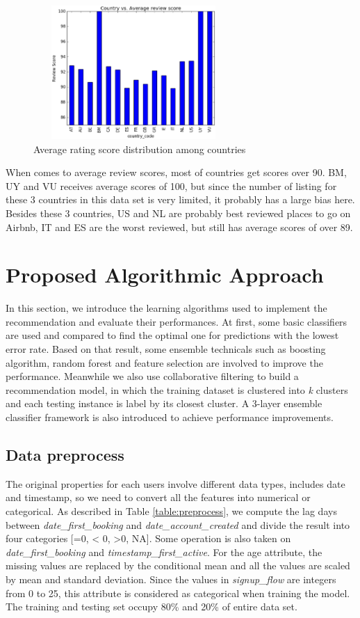 \documentclass{sig-alternate-05-2015}
\begin{document}
\begin{figure}[!htb]
\centering
\includegraphics[height=2in, width=3in]{country-avgRating}
\caption{Average rating score distribution among countries}
\end{figure}

When comes to average review scores, most of countries get scores over 90. BM, UY and VU receives average scores of 100, but since the number of listing for these 3 countries in this data set is very limited, it probably has a large bias here. Besides these 3 countries, US and NL are probably best reviewed places to go on Airbnb, IT and ES are the worst reviewed, but still has average scores of over 89.

\FloatBarrier
\section{Proposed Algorithmic Approach}
In this section, we introduce the learning algorithms used to implement the recommendation and evaluate their performances. At first, some basic classifiers are used and compared to find the optimal one for predictions with the lowest error rate. Based on that result, some ensemble technicals such as boosting algorithm, random forest and feature selection are involved to improve the performance. Meanwhile we also use collaborative filtering to build a recommendation model, in which the training dataset is clustered into \emph{k} clusters and each testing instance is label by its closest cluster. A 3-layer ensemble classifier framework is also introduced to achieve performance improvements.

\subsection{Data preprocess}
The original properties for each users involve different data types, includes date and timestamp, so we need to convert all the features into numerical or categorical. As described in Table \ref{table:preprocess}, we compute the lag days between \emph{date\_first\_booking} and \emph{date\_account\_created} and divide the result into four categories [=0, < 0, >0, NA]. Some operation is also taken on \emph{date\_first\_booking} and \emph{timestamp\_first\_active}. For the age attribute, the missing values are replaced by the conditional mean and all the values are scaled by mean and standard deviation. Since the values in \emph{signup\_flow} are integers from 0 to 25, this attribute is considered as categorical when training the model. The training and testing set occupy 80\% and 20\% of entire data set.
\end{document}
